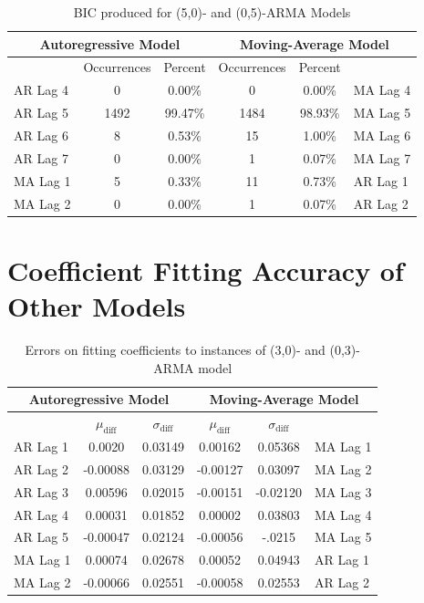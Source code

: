 \documentclass[oneside,12pt,openany]{book}
\begin{document}
\begin{table}[hbt!]
    \centering
    \begin{tabular}{|l|c|c|c|c|l|}
        \hline
        \multicolumn{3}{|c|}{Autoregressive Model} & \multicolumn{3}{c|}{Moving-Average Model} \\ \hline
        \cellcolor{black} & Occurrences & Percent & Occurrences & Percent & \cellcolor{black} \\ \hline
        AR Lag 4 & 0 & 0.00\% & 0 & 0.00\% & MA Lag 4 \\ \hline
        AR Lag 5 & 1492 & 99.47\% & 1484 & 98.93\% & MA Lag 5 \\ \hline
        AR Lag 6 & 8 & 0.53\% & 15 & 1.00\% & MA Lag 6 \\ \hline
        AR Lag 7 & 0 & 0.00\% & 1 & 0.07\% & MA Lag 7 \\ \hline
        MA Lag 1 & 5 & 0.33\% & 11 & 0.73\% & AR Lag 1 \\ \hline
        MA Lag 2 & 0 & 0.00\% & 1 & 0.07\% & AR Lag 2 \\ \hline
    \end{tabular}
    \caption{BIC produced for (5,0)- and (0,5)-ARMA Models}
    \label{tab:bic5}
\end{table}

\chapter{Coefficient Fitting Accuracy of Other Models}

\begin{table}[hbt!]
    \centering
    \begin{tabular}{|l|c|c|c|c|l|}
        \hline
        \multicolumn{3}{|c|}{Autoregressive Model} & \multicolumn{3}{c|}{Moving-Average Model} \\ \hline
        \cellcolor{black} & $\mu_{\text{diff}}$ & $\sigma_{\text{diff}}$ & $\mu_{\text{diff}}$ & $\sigma_{\text{diff}}$ &  \cellcolor{black} \\ \hline
        AR Lag 1 & 0.0020 & 0.03149 & 0.00162 & 0.05368 & MA Lag 1 \\ \hline
        AR Lag 2 & -0.00088 & 0.03129 & -0.00127 & 0.03097 & MA Lag 2 \\ \hline
        AR Lag 3 & 0.00596 & 0.02015 & -0.00151 & -0.02120 & MA Lag 3 \\ \hline
        AR Lag 4 & 0.00031 & 0.01852 & 0.00002 & 0.03803 & MA Lag 4 \\ \hline
        AR Lag 5 & -0.00047 & 0.02124 & -0.00056 & -.0215 & MA Lag 5 \\ \hline
        MA Lag 1 & 0.00074 & 0.02678 & 0.00052 & 0.04943 & AR Lag 1 \\ \hline
        MA Lag 2 & -0.00066 & 0.02551 & -0.00058 & 0.02553 & AR Lag 2 \\ \hline
    \end{tabular}
    \caption{Errors on fitting coefficients to instances of (3,0)- and (0,3)-ARMA model}
    \label{tab:errortsfitting3}
\end{table}
\end{document}
